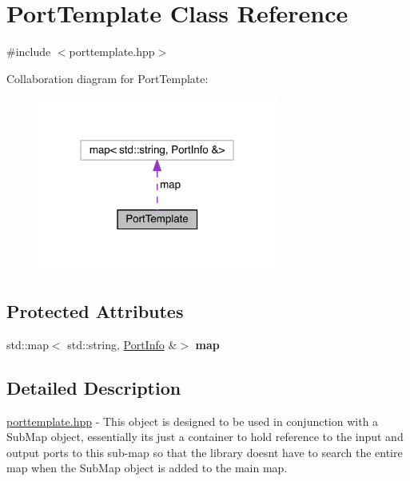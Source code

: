\hypertarget{class_port_template}{}\section{Port\+Template Class Reference}
\label{class_port_template}


{\ttfamily \#include $<$porttemplate.\+hpp$>$}



Collaboration diagram for Port\+Template\+:
\nopagebreak
\begin{figure}[H]
\begin{center}
\leavevmode
\includegraphics[width=223pt]{class_port_template__coll__graph}
\end{center}
\end{figure}
\subsection*{Protected Attributes}
\begin{DoxyCompactItemize}
\item 
\hypertarget{class_port_template_a1930a44af30c62b60b04e22bf83cbc34}{}\label{class_port_template_a1930a44af30c62b60b04e22bf83cbc34} 
std\+::map$<$ std\+::string, \hyperlink{struct_port_info}{Port\+Info} \&$>$ {\bfseries map}
\end{DoxyCompactItemize}


\subsection{Detailed Description}
\hyperlink{porttemplate_8hpp_source}{porttemplate.\+hpp} -\/ This object is designed to be used in conjunction with a Sub\+Map object, essentially its just a container to hold reference to the input and output ports to this sub-\/map so that the library doesn\textquotesingle{}t have to search the entire map when the Sub\+Map object is added to the main map.

